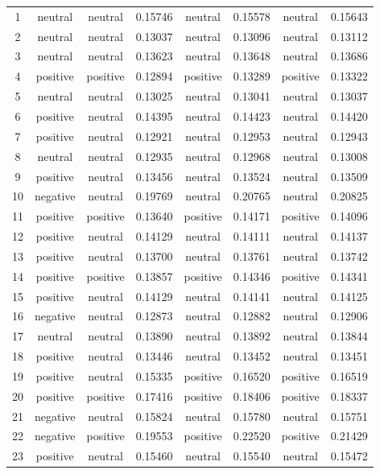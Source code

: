 \begin{center}
\begin{footnotesize}
\begin{longtable}{cc | cc | cc | cc}
1 & neutral & neutral & 0.15746 & neutral & 0.15578 & neutral & 0.15643 \\
2 & neutral & neutral & 0.13037 & neutral & 0.13096 & neutral & 0.13112 \\
3 & neutral & neutral & 0.13623 & neutral & 0.13648 & neutral & 0.13686 \\
4 & positive & positive & 0.12894 & positive & 0.13289 & positive & 0.13322 \\
5 & neutral & neutral & 0.13025 & neutral & 0.13041 & neutral & 0.13037 \\
6 & positive & neutral & 0.14395 & neutral & 0.14423 & neutral & 0.14420 \\
7 & positive & neutral & 0.12921 & neutral & 0.12953 & neutral & 0.12943 \\
8 & neutral & neutral & 0.12935 & neutral & 0.12968 & neutral & 0.13008 \\
9 & positive & neutral & 0.13456 & neutral & 0.13524 & neutral & 0.13509 \\
10 & negative & neutral & 0.19769 & neutral & 0.20765 & neutral & 0.20825 \\
11 & positive & positive & 0.13640 & positive & 0.14171 & positive & 0.14096 \\
12 & positive & neutral & 0.14129 & neutral & 0.14111 & neutral & 0.14137 \\
13 & positive & neutral & 0.13700 & neutral & 0.13761 & neutral & 0.13742 \\
14 & positive & positive & 0.13857 & positive & 0.14346 & positive & 0.14341 \\
15 & positive & neutral & 0.14129 & neutral & 0.14141 & neutral & 0.14125 \\
16 & negative & neutral & 0.12873 & neutral & 0.12882 & neutral & 0.12906 \\
17 & neutral & neutral & 0.13890 & neutral & 0.13892 & neutral & 0.13844 \\
18 & positive & neutral & 0.13446 & neutral & 0.13452 & neutral & 0.13451 \\
19 & positive & neutral & 0.15335 & positive & 0.16520 & positive & 0.16519 \\
20 & positive & positive & 0.17416 & positive & 0.18406 & positive & 0.18337 \\
21 & negative & neutral & 0.15824 & neutral & 0.15780 & neutral & 0.15751 \\
22 & negative & positive & 0.19553 & positive & 0.22520 & positive & 0.21429 \\
23 & positive & neutral & 0.15460 & neutral & 0.15540 & neutral & 0.15472 \\

\end{longtable}
\end{footnotesize}
\end{center}
